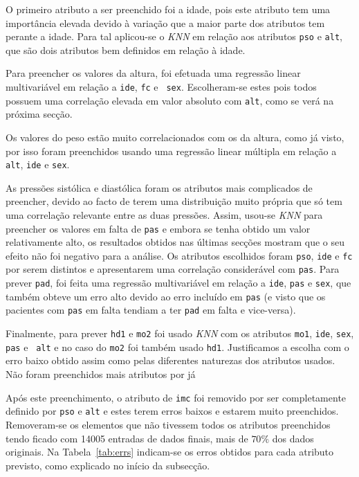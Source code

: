 \documentclass[10pt, conference, compsocconf]{IEEEtran}
\begin{document}
O primeiro atributo a ser preenchido foi a idade, pois este atributo
tem uma importância elevada devido à variação que a maior parte dos
atributos tem perante a idade. Para tal aplicou-se o \textit{KNN} em
relação aos atributos {\tt pso} e {\tt alt}, que são dois atributos
bem definidos em relação à idade.

Para preencher os valores da altura, foi efetuada uma regressão linear
multivariável em relação a {\tt ide}, {\tt fc} e {\tt
  sex}. Escolheram-se estes pois todos possuem uma correlação elevada
em valor absoluto com {\tt alt}, como se verá na próxima secção.

Os valores do peso estão muito correlacionados com os da altura, como
já visto, por isso foram preenchidos usando uma regressão linear
múltipla em relação a {\tt alt}, {\tt ide} e {\tt sex}.

As pressões sistólica e diastólica foram os atributos mais complicados
de preencher, devido ao facto de terem uma distribuição muito própria
que só tem uma correlação relevante entre as duas pressões. Assim,
usou-se \textit{KNN} para preencher os valores em falta de {\tt pas} e
embora se tenha obtido um valor relativamente alto, os resultados
obtidos nas últimas secções mostram que o seu efeito não foi negativo
para a análise. Os atributos escolhidos foram {\tt pso}, {\tt ide} e
{\tt fc} por serem distintos e apresentarem uma correlação
considerável com {\tt pas}. Para prever {\tt pad}, foi feita uma
regressão multivariável em relação a {\tt ide}, {\tt pas} e {\tt sex},
que também obteve um erro alto devido ao erro incluído em {\tt pas} (e
visto que os pacientes com {\tt pas} em falta tendiam a ter {\tt pad}
em falta e vice-versa).

Finalmente, para prever {\tt hd1} e {\tt mo2} foi usado \textit{KNN}
com os atributos {\tt mo1}, {\tt ide}, {\tt sex}, {\tt pas} e {\tt
  alt} e no caso do {\tt mo2} foi também usado {\tt hd1}. Justificamos
a escolha com o erro baixo obtido assim como pelas diferentes
naturezas dos atributos usados. Não foram preenchidos mais atributos por já

Após este preenchimento, o atributo de {\tt imc} foi removido por ser
completamente definido por {\tt pso} e {\tt alt} e estes terem erros
baixos e estarem muito preenchidos. Removeram-se os elementos que não
tivessem todos os atributos preenchidos tendo ficado com 14005
entradas de dados finais, mais de $70\%$ dos dados originais. Na
Tabela~\ref{tab:errs} indicam-se os erros obtidos para cada atributo
previsto, como explicado no início da subsecção.
\end{document}
